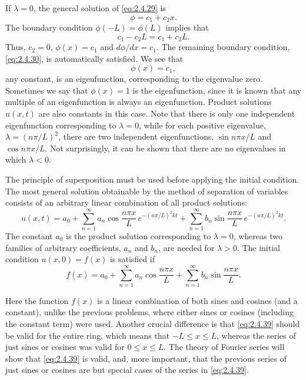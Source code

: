 If $\lambda = 0$, the general solution of \eqref{eq:2.4.29} is
\[
\phi = c_1 + c_2 x.
\]
The boundary condition $\phi(-L) = \phi(L)$ implies that
\[
c_1 - c_2 L = c_1 + c_2 L.
\]
Thus, $c_2 = 0$, $\phi(x) = c_1$ and $d\phi/dx = c_1$. The remaining boundary condition, \eqref{eq:2.4.30}, is automatically satisfied. We see that
\[
\phi(x) = c_1,
\]
any constant, is an eigenfunction, corresponding to the eigenvalue zero. Sometimes we say that $\phi(x) = 1$ is the eigenfunction, since it is known that any multiple of an eigenfunction is always an eigenfunction. Product solutions $u(x,t)$ are also constants in this case. Note that there is only one independent eigenfunction corresponding to $\lambda = 0$, while for each positive eigenvalue, $\lambda = (n\pi/L)^2$, there are two independent eigenfunctions, $\sin n\pi x/L$ and $\cos n\pi x/L$. Not surprisingly, it can be shown that there are no eigenvalues in which $\lambda < 0$.

The principle of superposition must be used before applying the initial condition. The most general solution obtainable by the method of separation of variables consists of an arbitrary linear combination of all product solutions:
\begin{equation}
\label{eq:2.4.38}
\boxed{u(x,t) = a_0 + \sum_{n=1}^{\infty} a_n\cos\frac{n\pi x}{L}\,e^{-(n\pi/L)^2 kt} + \sum_{n=1}^{\infty} b_n\sin\frac{n\pi x}{L}\,e^{-(n\pi/L)^2 kt}.}
\end{equation}
The constant $a_0$ is the product solution corresponding to $\lambda = 0$, whereas two families of arbitrary coefficients, $a_n$ and $b_n$, are needed for $\lambda > 0$. The initial condition $u(x,0) = f(x)$ is satisfied if
\begin{equation}
\label{eq:2.4.39}
\boxed{f(x) = a_0 + \sum_{n=1}^{\infty} a_n\cos\frac{n\pi x}{L} + \sum_{n=1}^{\infty} b_n\sin\frac{n\pi x}{L}.}
\end{equation}

Here the function $f(x)$ is a linear combination of both sines and cosines (and a constant), unlike the previous problems, where either sines or cosines (including the constant term) were used. Another crucial difference is that \eqref{eq:2.4.39} should be valid for the entire ring, which means that $-L \le x \le L$, whereas the series of just sines or cosines was valid for $0 \le x \le L$. The theory of Fourier series will show that \eqref{eq:2.4.39} is valid, and, more important, that the previous series of just sines or cosines are but special cases of the series in \eqref{eq:2.4.39}.

